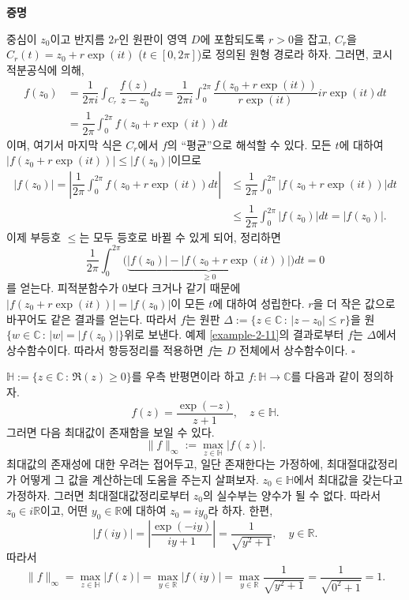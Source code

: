 {\bf 증명}

중심이 $z_0$이고 반지름 $2r$인 원판이 영역 $D$에 포함되도록 $r>0$을 잡고,
$C_r$을 $C_r(t) = z_0 + r\exp(it)$ ($t\in [0,2\pi]$)로 정의된 원형 경로라 하자.
그러면, 코시 적분공식에 의해,
\begin{align*}
f(z_0) &= \dfrac1{2\pi i} \int_{C_r} \dfrac{f(z)}{z-z_0}dz
=  \dfrac1{2\pi i} \int_0^{2\pi} \dfrac{f(z_0 + r\exp(it))}{r\exp(it)} ir\exp(it)dt \\
&=  \dfrac1{2\pi} \int_0^{2\pi} f(z_0 + r\exp(it))dt
\end{align*}
이며, 여기서 마지막 식은 $C_r$에서 $f$의 ``평균''으로 해석할 수 있다.
모든 $t$에 대하여 $|f(z_0 + r\exp(it))| \le |f(z_0)|$이므로
\begin{align*}
|f(z_0)| = \left|\dfrac1{2\pi} \int_0^{2\pi} f(z_0 + r\exp(it))dt \right| 
&\le \dfrac1{2\pi} \int_0^{2\pi}  \left| f(z_0 + r\exp(it)) \right|  dt \\
& \le \dfrac1{2\pi} \int_0^{2\pi}  \left| f(z_0) \right|  dt  = |f(z_0)|.
\end{align*}
이제
부등호 $\le$는 모두 등호로 바뀔 수 있게 되어, 정리하면
\[
 \dfrac1{2\pi} \int_0^{2\pi}  \big( 
 \underbrace{|f(z_0)|  - |f(z_0 + r\exp(it))|}_{\ge0} \big)  dt  = 0
\]
를 얻는다.
피적분함수가 $0$보다 크거나 같기 때문에 
$|f(z_0 + r\exp(it))|=|f(z_0)|$이 모든 $t$에 대하여 성립한다.
$r$을 더 작은 값으로 바꾸어도 같은 결과를 얻는다.
따라서 $f$는 
원판 $\Delta:= \{z \in \mathbb C \,:\, |z-z_0| \le r \}$을
원 $\{ w\in \mathbb C\,:\, |w| = |f(z_0)| \}$위로 보낸다.
예제 \ref{example-2-11}의 결과로부터
$f$는 $\Delta$에서 상수함수이다.
따라서 항등정리를 적용하면 $f$는 $D$ 전체에서  상수함수이다.
\hfill $\square$

\begin{saltexample}[label=example-4-9]{}{}
$\mathbb H := \{z\in\mathbb C\,:\, \Re(z)\ge 0\}$를 우측 반평면이라 하고
$f:\mathbb H\to \mathbb C$를 다음과 같이 정의하자.
\[
f(z) =  \dfrac{\exp(-z)}{z+1}, \quad z\in\mathbb H.
\]
그러면 다음 최대값이 존재함을 보일 수 있다.
\[
\|f\|_\infty := \max_{z\in\mathbb H} |f(z)|.
\]
최대값의 존재성에 대한 우려는 접어두고,
일단 존재한다는 가정하에, 최대절대값정리가 어떻게 그 값을 계산하는데 도움을 주는지  살펴보자.
\saltfigskip
$z_0\in \mathbb H$에서 최대값을 갖는다고 가정하자.
그러면 최대절대값정리로부터 $z_0$의 실수부는 양수가 될 수 없다.
따라서 $z_0 \in i\mathbb R$이고, 어떤 $y_0\in\mathbb R$에 대하여 $z_0=iy_0$라 하자.
한편,
\[
|f(iy)| = \left| \dfrac{\exp(-iy)}{iy+1} \right| = \dfrac1{\sqrt{y^2+1}}, \quad y\in\mathbb R.
\]
따라서
\[
\|f\|_\infty = \max\limits_{z\in\mathbb H} |f(z)|
= \max\limits_{y\in\mathbb R} |f(iy)| 
= \max\limits_{y\in\mathbb R} \dfrac1{\sqrt{y^2+1}} 
= \dfrac1{\sqrt{0^2+1}} = 1. 
\]
\end{saltexample}

